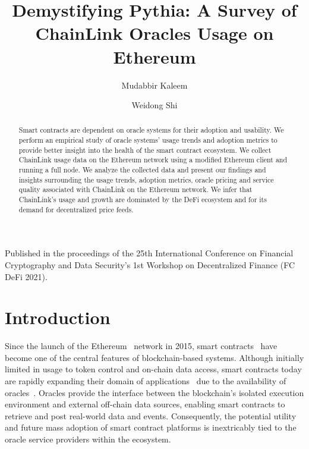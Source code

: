 \documentclass[runningheads]{llncs}
\begin{document}
%
\title{Demystifying Pythia: A Survey of ChainLink Oracles Usage on Ethereum}%
%
%
\author{Mudabbir Kaleem \and
Weidong Shi}
%
%
%
\maketitle              %
%
\begin{center}
Published in the proceedings of the 25th International Conference on Financial Cryptography and Data Security's 1st Workshop on Decentralized Finance (FC DeFi 2021).
\end{center}

\begin{abstract}
Smart contracts are dependent on oracle systems for their adoption and usability. We perform an empirical study of oracle systems' usage trends and adoption metrics to provide better insight into the health of the smart contract ecosystem. We collect ChainLink usage data on the Ethereum network using a modified Ethereum client and running a full node. We analyze the collected data and present our findings and insights surrounding the usage trends, adoption metrics, oracle pricing and service quality associated with ChainLink on the Ethereum network. We infer that ChainLink's usage and growth are dominated by the DeFi ecosystem and for its demand for decentralized price feeds.

\end{abstract}
%
%
%
\section{Introduction}
Since the launch of the Ethereum~\cite{buterin2014ethereum} network in 2015, smart contracts~\cite{szabo1997formalizing} have become one of the central features of blockchain-based systems. Although initially limited in usage to token control and on-chain data access, smart contracts today are rapidly expanding their domain of applications~\cite{kehrli2016blockchain} due to the availability of oracles~\cite{al2020trustworthy}. Oracles provide the interface between the blockchain's isolated execution environment and external off-chain data sources, enabling smart contracts to retrieve and post real-world data and events. Consequently, the potential utility and future mass adoption of smart contract platforms is inextricably tied to the oracle service providers within the ecosystem.
\end{document}
